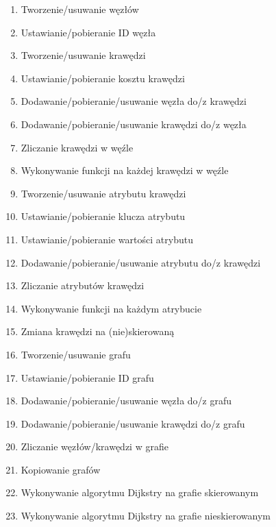 \documentclass[a4paper,12pt,polish,oneside,openright]{thesis}
\begin{document}
\begin{enumerate}
	\item Tworzenie/usuwanie węzłów
	\item Ustawianie/pobieranie ID węzła
	\item Tworzenie/usuwanie krawędzi
	\item Ustawianie/pobieranie kosztu krawędzi
	\item Dodawanie/pobieranie/usuwanie węzła do/z krawędzi
	\item Dodawanie/pobieranie/usuwanie krawędzi do/z węzła
	\item Zliczanie krawędzi w węźle
	\item Wykonywanie funkcji na każdej krawędzi w węźle
	\item Tworzenie/usuwanie atrybutu krawędzi
	\item Ustawianie/pobieranie klucza atrybutu
	\item Ustawianie/pobieranie wartości atrybutu
	\item Dodawanie/pobieranie/usuwanie atrybutu do/z krawędzi
	\item Zliczanie atrybutów krawędzi
	\item Wykonywanie funkcji na każdym atrybucie
	\item Zmiana krawędzi na (nie)skierowaną
	\item Tworzenie/usuwanie grafu
	\item Ustawianie/pobieranie ID grafu
	\item Dodawanie/pobieranie/usuwanie węzła do/z grafu
	\item Dodawanie/pobieranie/usuwanie krawędzi do/z grafu
	\item Zliczanie węzłów/krawędzi w grafie
	\item Kopiowanie grafów
	\item Wykonywanie algorytmu Dijkstry na grafie skierowanym
	\item Wykonywanie algorytmu Dijkstry na grafie nieskierowanym
\end{enumerate}
\end{document}
